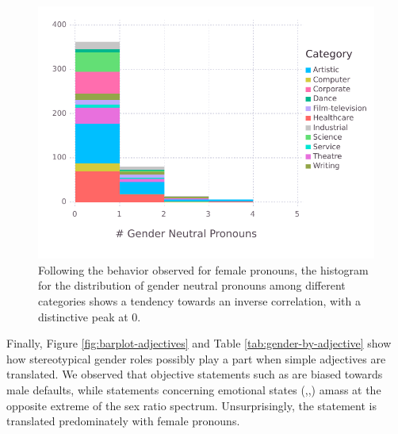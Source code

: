 \documentclass{article}
\begin{document}
\begin{figure}[H]
	\centering
	\includegraphics[width=\linewidth]{pictures/histogram-neutral}
	\caption{Following the behavior observed for female pronouns, the histogram for the distribution of gender neutral pronouns among different categories shows a tendency towards an inverse correlation, with a distinctive peak at 0.}
	\label{fig:histogram-neutral}
\end{figure}

Finally, Figure \ref{fig:barplot-adjectives} and Table \ref{tab:gender-by-adjective} show how stereotypical gender roles possibly play a part when simple adjectives are translated. We observed that objective statements such as  are biased towards male defaults, while statements concerning emotional states (,,) amass at the opposite extreme of the sex ratio spectrum. Unsurprisingly, the statement  is translated predominately with female pronouns.
\end{document}
